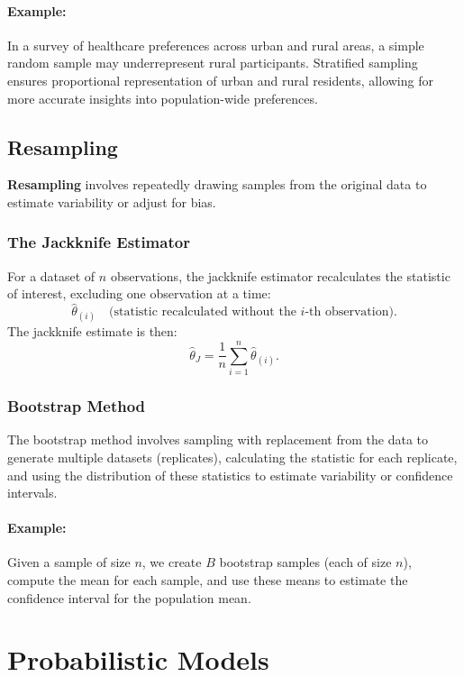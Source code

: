 \documentclass[12pt,a4paper]{article}
\begin{document}
\paragraph{Example:}
In a survey of healthcare preferences across urban and rural areas, a simple random sample may underrepresent rural participants. Stratified sampling ensures proportional representation of urban and rural residents, allowing for more accurate insights into population-wide preferences.


\subsection{Resampling}
\textbf{Resampling} involves repeatedly drawing samples from the original data to estimate variability or adjust for bias.

\subsubsection*{The Jackknife Estimator}
For a dataset of $n$ observations, the jackknife estimator recalculates the statistic of interest, excluding one observation at a time:
\[
\hat{\theta}_{(i)} \quad \text{(statistic recalculated without the $i$-th observation)}.
\]
The jackknife estimate is then:
\[
\hat{\theta}_J = \frac{1}{n} \sum_{i=1}^n \hat{\theta}_{(i)}.
\]

\subsubsection*{Bootstrap Method}
The bootstrap method involves sampling with replacement from the data to generate multiple datasets (replicates), calculating the statistic for each replicate, and using the distribution of these statistics to estimate variability or confidence intervals.

\paragraph{Example:}
Given a sample of size $n$, we create $B$ bootstrap samples (each of size $n$), compute the mean for each sample, and use these means to estimate the confidence interval for the population mean.





\section{Probabilistic Models}
\end{document}

